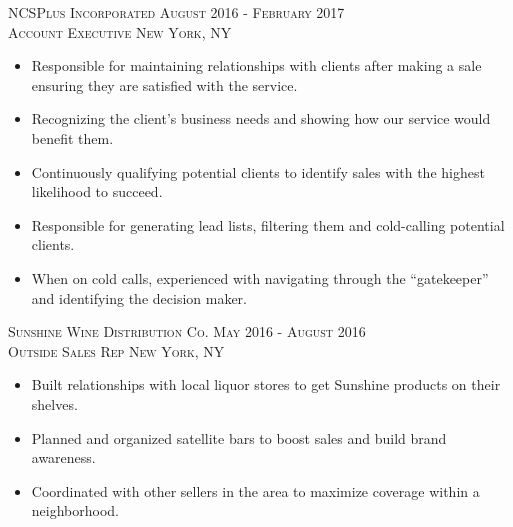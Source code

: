 \documentclass[oneside, final]{scrartcl}
\begin{document}
\begin{center}
\textsc{NCSPlus Incorporated \hfill August 2016 - February 2017 \\}
\textsc{Account Executive \hfill New York, NY\\}
\begin{itemize}
	\setlength{\itemsep}{1pt}
	\setlength{\parskip}{0pt}
	\setlength{\parsep}{0pt}
	\setlength{\leftmargin}{-5mm}
    \item Responsible for maintaining relationships with clients after making a sale ensuring they are satisfied with the service.
    \item Recognizing the client's business needs and showing how our service would benefit them. 
    \item Continuously qualifying potential clients to identify sales with the highest likelihood to succeed.
    \item Responsible for generating lead lists, filtering them and cold-calling potential clients.
    \item When on cold calls, experienced with navigating through the  ``gatekeeper'' and identifying the decision maker.
\end{itemize}

\textsc{Sunshine Wine Distribution Co. \hfill May 2016 - August 2016 \\}
\textsc{Outside Sales Rep \hfill New York, NY\\}
\begin{itemize}
	\setlength{\itemsep}{1pt}
	\setlength{\parskip}{0pt}
	\setlength{\parsep}{0pt}
	\setlength{\leftmargin}{-5mm}
    \item Built relationships with local liquor stores to get Sunshine products on their shelves.
    \item Planned and organized satellite bars to boost sales and build brand awareness.
    \item Coordinated with other sellers in the area to maximize coverage within a neighborhood.
\end{itemize}

\begin{comment}
    \textsc{Yono's Restaurant \hfill August 2015 - June 2016 \\}
    \textsc{Bar Manager \hfill Albany, NY\\}
    \begin{itemize}
        \setlength{\itemsep}{1pt}
        \setlength{\parskip}{0pt}
        \setlength{\parsep}{0pt}
        \setlength{\leftmargin}{-5mm}
        \item Curated a wine list of over 1,000 wines including their origin, geography and characteristics.
        \item Creatively found ways to make angry customers happy without hurting the sale or the servers tip.
        \item Responsible for creating new cocktails and building drink lists.
        \item Trained new bartenders and cocktail servers, even those senior to me without seeming condescending.
        \item Attended wine tastings and chose new products for our master wine list.
    \end{itemize}


\end{comment}
\end{center}
\end{document}
